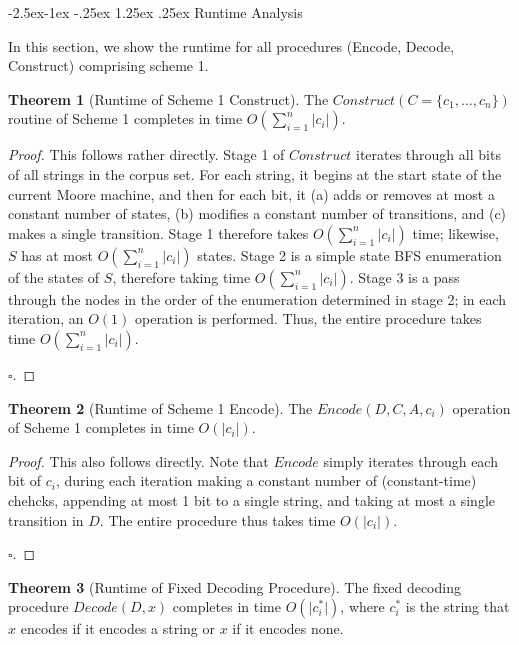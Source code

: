 \documentclass{article}
\makeatletter
\renewcommand\paragraph{\@startsection{paragraph}{4}{\z@}%
            {-2.5ex\@plus -1ex \@minus -.25ex}%
            {1.25ex \@plus .25ex}%
            {\normalfont\normalsize\bfseries}}
\theoremstyle{definition}
\newtheorem{theorem}{Theorem}[section]
\makeatother
\begin{document}
\paragraph{Runtime Analysis}

In this section, we show the runtime for all procedures (Encode, Decode, Construct)
comprising scheme 1.

\begin{theorem}[Runtime of Scheme 1 Construct]
The $Construct(C=\{c_1,...,c_n\})$ routine of Scheme 1 completes in time
$O(\sum_{i=1}^{n}\lvert c_i \rvert)$. 
\end{theorem}

\begin{proof}
This follows rather directly.  Stage 1 of $Construct$ iterates through all 
bits of all strings in the corpus set.  For each string, it begins at the 
start state of the current Moore machine, and then for each bit, it (a) 
adds or removes at most a constant number of states, (b) modifies a constant 
number of transitions, and (c) makes a single transition.  Stage 1 therefore 
takes $O(\sum_{i=1}^{n}\lvert c_i \rvert)$ time; likewise, $S$ has at most 
$O(\sum_{i=1}^{n}\lvert c_i \rvert)$ states.  Stage 2 is a simple state BFS 
enumeration of the states of $S$, therefore taking time 
$O(\sum_{i=1}^{n}\lvert c_i \rvert)$.  Stage 3 is a pass through the 
nodes in the order of the enumeration determined in stage 2; in each iteration,
an $O(1)$ operation is performed.  Thus, the entire procedure takes time  
$O(\sum_{i=1}^{n}\lvert c_i \rvert)$.

$\square$.
\end{proof}

\begin{theorem}[Runtime of Scheme 1 Encode]
The $Encode(D,C,A,c_i)$ operation of Scheme 1 completes in time 
$O(\lvert c_i \rvert)$.
\end{theorem}

\begin{proof}
This also follows directly.  Note that $Encode$ simply iterates through 
each bit of $c_i$, during each iteration making a constant number of (constant-time)
chehcks, appending at most 1 bit to a single string, and taking at most a 
single transition in $D$.  The entire procedure thus takes time $O(\lvert c_i \rvert)$.

$\square$.
\end{proof}

\begin{theorem}[Runtime of Fixed Decoding Procedure]
The fixed decoding procedure $Decode(D,x)$ completes in time $O(\lvert c_i^*\rvert)$, 
where $c_i^*$ is the string that $x$ encodes if it encodes a string or $x$ if it 
encodes none.
\end{theorem}
\end{document}
